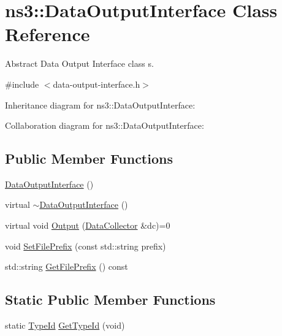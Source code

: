 \hypertarget{classns3_1_1DataOutputInterface}{}\section{ns3\+:\+:Data\+Output\+Interface Class Reference}
\label{classns3_1_1DataOutputInterface}


Abstract Data Output Interface class s.  




{\ttfamily \#include $<$data-\/output-\/interface.\+h$>$}



Inheritance diagram for ns3\+:\+:Data\+Output\+Interface\+:


Collaboration diagram for ns3\+:\+:Data\+Output\+Interface\+:
\subsection*{Public Member Functions}
\begin{DoxyCompactItemize}
\item 
\hyperlink{classns3_1_1DataOutputInterface_af196e9274a67ac70b7ccf4ec73d8faec}{Data\+Output\+Interface} ()
\item 
virtual \hyperlink{classns3_1_1DataOutputInterface_ae1dc56e19c70bce2564aabc1fc02288f}{$\sim$\+Data\+Output\+Interface} ()
\item 
virtual void \hyperlink{classns3_1_1DataOutputInterface_a50d5c4d0c77655d734dd2c8c11edbe2e}{Output} (\hyperlink{classns3_1_1DataCollector}{Data\+Collector} \&dc)=0
\item 
void \hyperlink{classns3_1_1DataOutputInterface_ac1861e74f63cf0827f680e3e989765ef}{Set\+File\+Prefix} (const std\+::string prefix)
\item 
std\+::string \hyperlink{classns3_1_1DataOutputInterface_aaeede5ad2634c4857a978b1da8842891}{Get\+File\+Prefix} () const 
\end{DoxyCompactItemize}
\subsection*{Static Public Member Functions}
\begin{DoxyCompactItemize}
\item 
static \hyperlink{classns3_1_1TypeId}{Type\+Id} \hyperlink{classns3_1_1DataOutputInterface_a731a2d43ea8b068fb5d499ef621d2a9c}{Get\+Type\+Id} (void)
\end{DoxyCompactItemize}
